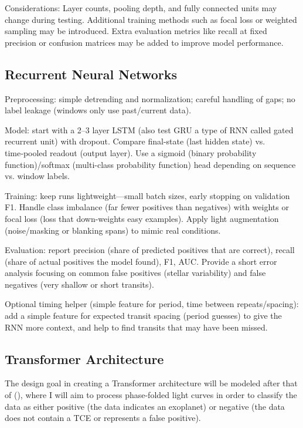 \documentclass[letterpaper]{article} %
\begin{document}
Considerations: Layer counts, pooling depth, and fully connected units may change during testing. Additional training methods such as focal loss or weighted sampling may be introduced. Extra evaluation metrics like recall at fixed precision or confusion matrices may be added to improve model performance.

\subsection{Recurrent Neural Networks}
Preprocessing: simple detrending and normalization; careful handling of gaps; no label leakage (windows only use past/current data).

Model: start with a 2–3 layer LSTM (also test GRU a type of RNN called gated recurrent unit) with dropout. Compare final-state (last hidden state) vs. time‑pooled readout (output layer). Use a sigmoid (binary probability function)/softmax (multi-class probability function) head depending on sequence vs. window labels.

Training: keep runs lightweight—small batch sizes, early stopping on validation F1. Handle class imbalance (far fewer positives than negatives) with weights or focal loss (loss that down-weights easy examples). Apply light augmentation (noise/masking or blanking spans) to mimic real conditions.

Evaluation: report precision (share of predicted positives that are correct), recall (share of actual positives the model found), F1, AUC. Provide a short error analysis focusing on common false positives (stellar variability) and false negatives (very shallow or short transits).

Optional timing helper (simple feature for period, time between repeats/spacing): add a simple feature for expected transit spacing (period guesses) to give the RNN more context, and help to find transits that may have been missed.

\subsection{Transformer Architecture}

The design goal in creating a Transformer architecture will be modeled after that of \citeauthor{salinas2023distinguishingtransitfalsepositives} (\citeyear{salinas2023distinguishingtransitfalsepositives}), where I will aim to process phase-folded light curves in order to classify the data as either positive (the data indicates an exoplanet) or negative (the data does not contain a TCE or represents a false positive). 
\end{document}
